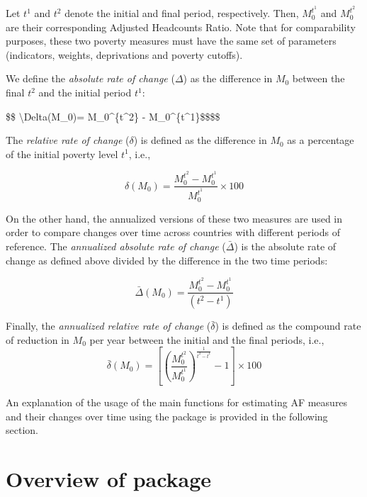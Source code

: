 Let \(t^1\) and \(t^2\) denote the initial and final period, respectively.
Then, \(M_0^{t^1}\) and \(M_0^{t^2}\) are their corresponding Adjusted
Headcounts Ratio. Note that for comparability purposes, these two
poverty measures must have the same set of parameters (indicators,
weights, deprivations and poverty cutoffs).

We define the \textit{absolute rate of change} (\(\Delta\)) as the
difference in \(M_0\) between the final \(t^2\) and the initial period
\(t^1\):

\$\$ \textbackslash Delta(M\_0)= M\_0\^{}\{t\^{}2\} - M\_0\^{}\{t\^{}1\}\$\$\$\$

The \textit{relative rate of change} (\(\delta\)) is defined as the
difference in \(M_0\) as a percentage of the initial poverty level \(t^1\),
i.e.,

\begin{equation}
\delta(M_0)= \frac{M_0^{t^2} - M_0^{t^1}}{M_0^{t^1}} \times 100
\end{equation}

On the other hand, the annualized versions of these two measures are
used in order to compare changes over time across countries with
different periods of reference. The
\textit{annualized absolute rate of change} (\(\bar{\Delta}\)) is the
absolute rate of change as defined above divided by the difference in
the two time periods:

\begin{equation}
\bar{\Delta}(M_0)= \frac{M_0^{t^2} - M_0^{t^1}}{(t^2 - t^1)}
\end{equation}

Finally, the \textit{annualized relative rate of change}
(\(\bar{\delta}\)) is defined as the compound rate of reduction in \(M_0\)
per year between the initial and the final periods, i.e.,
\begin{equation}\label{eq:ann_rel_change}
\bar{\delta}(M_0)= \left[ \left( \frac{M_0^{t^2}}{M_0^{t^1}} \right)^{\frac{1}{t^2 - t^1}} - 1 \right] \times 100
\end{equation}

An explanation of the usage of the main functions for estimating AF
measures and their changes over time using the  package is
provided in the following section.

\hypertarget{overview-of-package}{%
\section{\texorpdfstring{Overview of  package}{Overview of  package}}\label{overview-of-package}}


